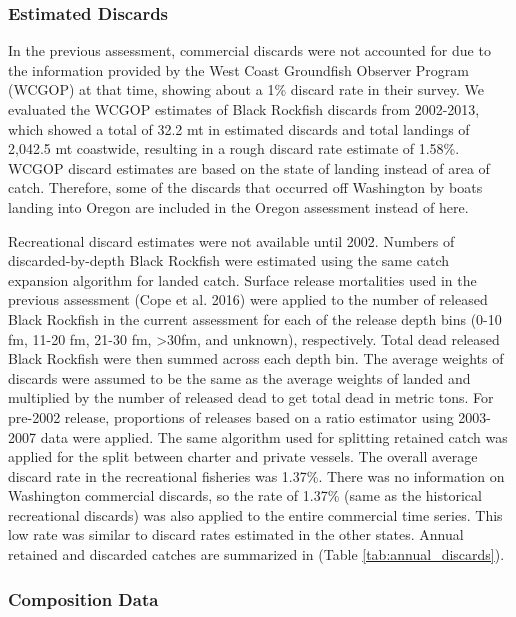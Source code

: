 \documentclass[11pt,
  letterpaper,
]{article}
\begin{document}
\hypertarget{estimated-discards}{%
\subsubsection{Estimated Discards}\label{estimated-discards}}

In the previous assessment, commercial discards were not accounted for due to the information provided by the West Coast Groundfish Observer Program (WCGOP) at that time, showing about a 1\% discard rate in their survey. We evaluated the WCGOP estimates of Black Rockfish discards from 2002-2013, which showed a total of 32.2 mt in estimated discards and total landings of 2,042.5 mt coastwide, resulting in a rough discard rate estimate of 1.58\%. WCGOP discard estimates are based on the state of landing instead of area of catch. Therefore, some of the discards that occurred off Washington by boats landing into Oregon are included in the Oregon assessment instead of here.

Recreational discard estimates were not available until 2002. Numbers of discarded-by-depth Black Rockfish were estimated using the same catch expansion algorithm for landed catch. Surface release mortalities used in the previous assessment (Cope et al. 2016) were applied to the number of released Black Rockfish in the current assessment for each of the release depth bins (0-10 fm, 11-20 fm, 21-30 fm, \textgreater30fm, and unknown), respectively. Total dead released Black Rockfish were then summed across each depth bin. The average weights of discards were assumed to be the same as the average weights of landed and multiplied by the number of released dead to get total dead in metric tons. For pre-2002 release, proportions of releases based on a ratio estimator using 2003-2007 data were applied. The same algorithm used for splitting retained catch was applied for the split between charter and private vessels. The overall average discard rate in the recreational fisheries was 1.37\%. There was no information on Washington commercial discards, so the rate of 1.37\% (same as the historical recreational discards) was also applied to the entire commercial time series. This low rate was similar to discard rates estimated in the other states. Annual retained and discarded catches are summarized in (Table \ref{tab:annual_discards}).

\hypertarget{composition-data}{%
\subsubsection{Composition Data}\label{composition-data}}
\end{document}
